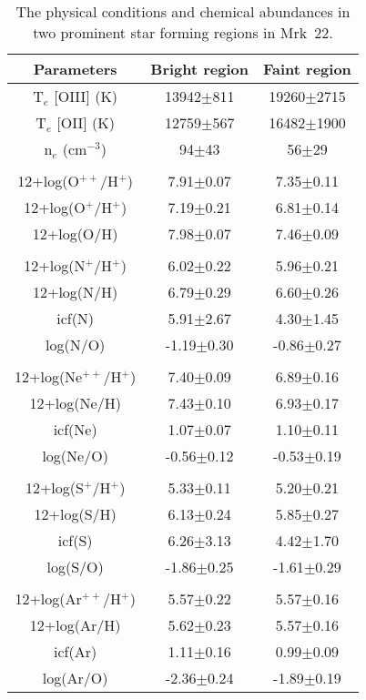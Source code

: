 \documentclass[useAMS,usenatbib]{mn2e}
\begin{document}
\begin{table}\label{tab:03}
\centering
\caption{The physical conditions and chemical abundances in two prominent star forming regions in Mrk~22.}
\begin{tabular}{c|c|c}
\hline 
 Parameters & Bright region & Faint region\\
\hline 

T$_{e}$ [O{\sc III}] (K)  & 13942$\pm$811  & 19260$\pm$2715\\
T$_{e}$ [O{\sc II}] (K)   & 12759$\pm$567  & 16482$\pm$1900\\
n$_{e}$ (cm$^{-3}$)       & 94$\pm$43      & 56$\pm$29\\\\ 
12+log(O$^{++}$/H$^{+}$)  & 7.91$\pm$0.07  & 7.35$\pm$0.11\\
12+log(O$^{+}$/H$^{+}$)   & 7.19$\pm$0.21  & 6.81$\pm$0.14\\
12+log(O/H)               & 7.98$\pm$0.07  & 7.46$\pm$0.09\\\\
12+log(N$^{+}$/H$^{+}$)   & 6.02$\pm$0.22  & 5.96$\pm$0.21\\
12+log(N/H)               & 6.79$\pm$0.29  & 6.60$\pm$0.26\\
icf(N)                    & 5.91$\pm$2.67  & 4.30$\pm$1.45\\
log(N/O)                  & -1.19$\pm$0.30 & -0.86$\pm$0.27\\\\
12+log(Ne$^{++}$/H$^{+}$) & 7.40$\pm$0.09  & 6.89$\pm$0.16\\
12+log(Ne/H)              & 7.43$\pm$0.10  & 6.93$\pm$0.17\\
icf(Ne)                   & 1.07$\pm$0.07  & 1.10$\pm$0.11\\
log(Ne/O)                 & -0.56$\pm$0.12 & -0.53$\pm$0.19\\\\
12+log(S$^{+}$/H$^{+}$)   & 5.33$\pm$0.11  & 5.20$\pm$0.21\\
12+log(S/H)               & 6.13$\pm$0.24  & 5.85$\pm$0.27\\
icf(S)                    & 6.26$\pm$3.13  & 4.42$\pm$1.70\\
log(S/O)                  & -1.86$\pm$0.25 & -1.61$\pm$0.29\\\\
12+log(Ar$^{++}$/H$^{+}$) & 5.57$\pm$0.22  & 5.57$\pm$0.16\\
12+log(Ar/H)              & 5.62$\pm$0.23  & 5.57$\pm$0.16\\
icf(Ar)                   & 1.11$\pm$0.16  & 0.99$\pm$0.09\\
log(Ar/O)                 & -2.36$\pm$0.24 & -1.89$\pm$0.19\\
\hline
\end{tabular}  
\end{table}
\end{document}
